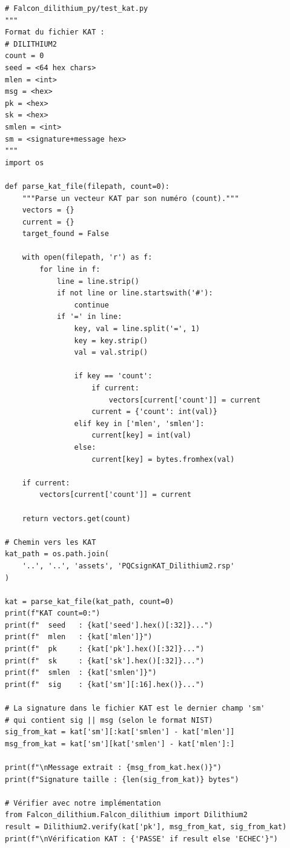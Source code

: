\documentclass[12pt, a4paper]{article}
\begin{document}
\begin{solution}
\begin{lstlisting}[style=python]
# Falcon_dilithium_py/test_kat.py
"""
Format du fichier KAT :
# DILITHIUM2
count = 0
seed = <64 hex chars>
mlen = <int>
msg = <hex>
pk = <hex>
sk = <hex>
smlen = <int>
sm = <signature+message hex>
"""
import os

def parse_kat_file(filepath, count=0):
    """Parse un vecteur KAT par son numéro (count)."""
    vectors = {}
    current = {}
    target_found = False

    with open(filepath, 'r') as f:
        for line in f:
            line = line.strip()
            if not line or line.startswith('#'):
                continue
            if '=' in line:
                key, val = line.split('=', 1)
                key = key.strip()
                val = val.strip()

                if key == 'count':
                    if current:
                        vectors[current['count']] = current
                    current = {'count': int(val)}
                elif key in ['mlen', 'smlen']:
                    current[key] = int(val)
                else:
                    current[key] = bytes.fromhex(val)

    if current:
        vectors[current['count']] = current

    return vectors.get(count)

# Chemin vers les KAT
kat_path = os.path.join(
    '..', '..', 'assets', 'PQCsignKAT_Dilithium2.rsp'
)

kat = parse_kat_file(kat_path, count=0)
print(f"KAT count=0:")
print(f"  seed   : {kat['seed'].hex()[:32]}...")
print(f"  mlen   : {kat['mlen']}")
print(f"  pk     : {kat['pk'].hex()[:32]}...")
print(f"  sk     : {kat['sk'].hex()[:32]}...")
print(f"  smlen  : {kat['smlen']}")
print(f"  sig    : {kat['sm'][:16].hex()}...")

# La signature dans le fichier KAT est le dernier champ 'sm'
# qui contient sig || msg (selon le format NIST)
sig_from_kat = kat['sm'][:kat['smlen'] - kat['mlen']]
msg_from_kat = kat['sm'][kat['smlen'] - kat['mlen']:]

print(f"\nMessage extrait : {msg_from_kat.hex()}")
print(f"Signature taille : {len(sig_from_kat)} bytes")

# Vérifier avec notre implémentation
from Falcon_dilithium.Falcon_dilithium import Dilithium2
result = Dilithium2.verify(kat['pk'], msg_from_kat, sig_from_kat)
print(f"\nVérification KAT : {'PASSE' if result else 'ECHEC'}")
\end{lstlisting}
\end{solution}
\end{document}
